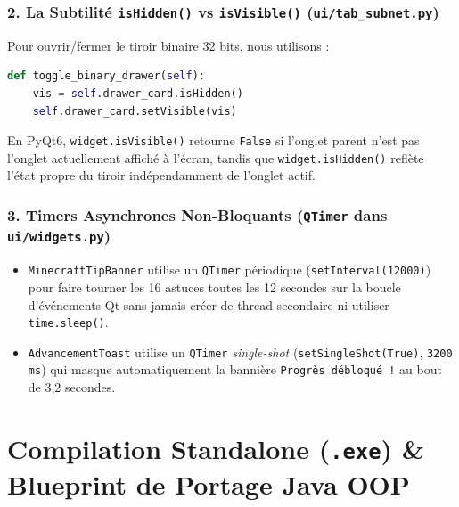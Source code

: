 \documentclass[11pt,a4paper]{article}
\begin{document}
\subsubsection{2. La Subtilité \texttt{isHidden()} vs \texttt{isVisible()} (\texttt{ui/tab\_subnet.py})}
Pour ouvrir/fermer le tiroir binaire 32 bits, nous utilisons :
\begin{lstlisting}[language=Python]
def toggle_binary_drawer(self):
    vis = self.drawer_card.isHidden()
    self.drawer_card.setVisible(vis)
\end{lstlisting}
En PyQt6, \texttt{widget.isVisible()} retourne \texttt{False} si l'onglet parent n'est pas l'onglet actuellement affiché à l'écran, tandis que \texttt{widget.isHidden()} reflète l'état propre du tiroir indépendamment de l'onglet actif.

\subsubsection{3. Timers Asynchrones Non-Bloquants (\texttt{QTimer} dans \texttt{ui/widgets.py})}
\begin{itemize}
    \item \texttt{MinecraftTipBanner} utilise un \texttt{QTimer} périodique (\texttt{setInterval(12000)}) pour faire tourner les 16 astuces toutes les 12 secondes sur la boucle d'événements Qt sans jamais créer de thread secondaire ni utiliser \texttt{time.sleep()}.
    \item \texttt{AdvancementToast} utilise un \texttt{QTimer} \textit{single-shot} (\texttt{setSingleShot(True)}, \texttt{3200 ms}) qui masque automatiquement la bannière \texttt{Progrès débloqué !} au bout de 3,2 secondes.
\end{itemize}

\newpage
\section{Compilation Standalone (\texttt{.exe}) \& Blueprint de Portage Java OOP}
\end{document}
